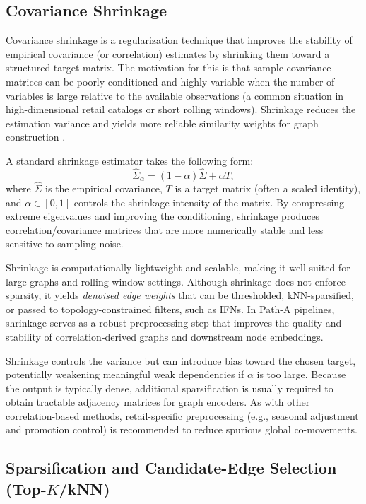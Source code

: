 \subsection{Covariance Shrinkage}
\label{subsec:shrinkage}

Covariance shrinkage is a regularization technique that improves the stability of empirical covariance (or correlation) estimates by shrinking them toward a structured target matrix. The motivation for this is that sample covariance matrices can be poorly conditioned and highly variable when the number of variables is large relative to the available observations (a common situation in high-dimensional retail catalogs or short rolling windows). Shrinkage reduces the estimation variance and yields more reliable similarity weights for graph construction \cite{ledoit2004wellconditioned}.

A standard shrinkage estimator takes the following form:
\begin{equation}
\hat{\Sigma}_{\alpha} = (1-\alpha)\hat{\Sigma} + \alpha T,
\end{equation}
where $\hat{\Sigma}$ is the empirical covariance, $T$ is a target matrix (often a scaled identity), and $\alpha \in [0,1]$ controls the shrinkage intensity of the matrix. By compressing extreme eigenvalues and improving the conditioning, shrinkage produces correlation/covariance matrices that are more numerically stable and less sensitive to sampling noise.

Shrinkage is computationally lightweight and scalable, making it well suited for large graphs and rolling window settings. Although shrinkage does not enforce sparsity, it yields \emph{denoised edge weights} that can be thresholded, kNN-sparsified, or passed to topology-constrained filters, such as IFNs. In Path-A pipelines, shrinkage serves as a robust preprocessing step that improves the quality and stability of correlation-derived graphs and downstream node embeddings.

Shrinkage controls the variance but can introduce bias toward the chosen target, potentially weakening meaningful weak dependencies if $\alpha$ is too large. Because the output is typically dense, additional sparsification is usually required to obtain tractable adjacency matrices for graph encoders. As with other correlation-based methods, retail-specific preprocessing (e.g., seasonal adjustment and promotion control) is recommended to reduce spurious global co-movements.

\subsection{Sparsification and Candidate-Edge Selection (Top-$K$/kNN)}
\label{ss:sparsification-topk}

